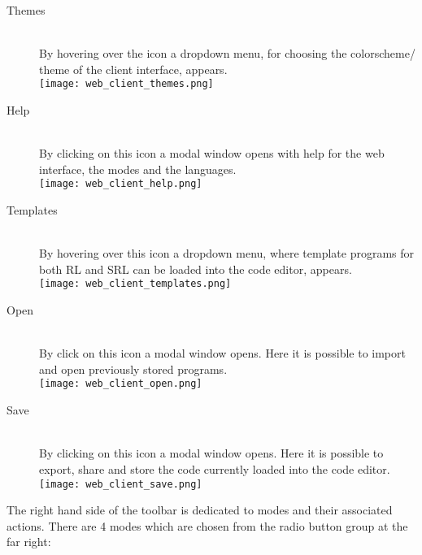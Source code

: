 \begin{description}

  \item[ Themes]~\\
    By hovering over the icon a dropdown menu, for choosing the colorscheme/ theme of the client interface, appears.\\
    \texttt{[image: web\_client\_themes.png]}\\

  \item[ Help]~\\
    By clicking on this icon a modal window opens with help for the web interface, the modes and the languages.\\
    \texttt{[image: web\_client\_help.png]}\\

  \item[ Templates]~\\
    By hovering over this icon a dropdown menu, where template programs for both RL and SRL can be loaded into the code editor, appears.\\
    \texttt{[image: web\_client\_templates.png]}\\

  \item[ Open]~\\
    By click on this icon a modal window opens. Here it is possible to import and open previously stored programs.\\
    \texttt{[image: web\_client\_open.png]}\\

  \item[ Save]~\\
    By clicking on this icon a modal window opens. Here it is possible to export, share and store the code currently loaded into the code editor.\\
    \texttt{[image: web\_client\_save.png]}\\

\end{description}

The right hand side of the toolbar is dedicated to modes and their associated actions. There are 4 modes which are chosen from the radio button group at the far right:\\

